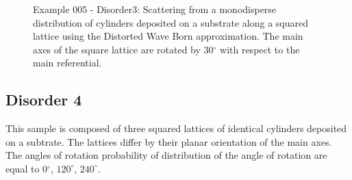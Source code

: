 \begin{figure}[H]
\hfill
{}
\hfill
{}
\hfill
\caption{Example 005 - Disorder3: Scattering from a monodisperse distribution of cylinders deposited on a substrate along a squared lattice using the Distorted Wave Born approximation. The main axes of the square lattice are rotated by 30$^{\circ}$ with respect to the main referential.}
\label{fig:PythonEx5Dis3}
\end{figure}


\subsection{Disorder 4}
This sample is composed of three squared lattices of identical cylinders deposited on a subtrate. The lattices differ by their planar orientation of the main axes. The angles of rotation  probability of distribution of the angle of rotation are equal to 0$^{\circ}$, $120^{\circ}$, $240^{\circ}$.

